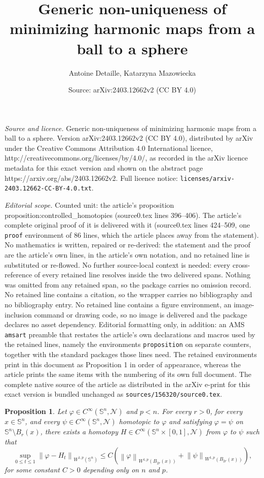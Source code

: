 \documentclass[10pt,a4paper]{amsart}
\title{Generic non-uniqueness of minimizing harmonic maps from a ball to a sphere}
\author{Antoine Detaille, Katarzyna Mazowiecka}
\date{Source: arXiv:2403.12662v2 (CC BY 4.0)}
\newtheorem{proposition}{Proposition}
\def\S{{\mathbb S}}
\newcommand{\brac}[1]{\left (#1 \right )}
\def\n{{\mathcal N}}
\newcommand{\norm}[1]{\left\|{#1}\right\|}
\begin{document}
\maketitle

\noindent\emph{Source and licence.} Generic non-uniqueness of minimizing harmonic maps from a ball to a sphere. Version arXiv:2403.12662v2 (CC BY 4.0), distributed by arXiv under the Creative Commons Attribution 4.0 International licence, http://creativecommons.org/licenses/by/4.0/, as recorded in the arXiv licence metadata for this exact version and shown on the abstract page https://arxiv.org/abs/2403.12662v2. Full licence notice: \texttt{licenses/arxiv-2403.12662-CC-BY-4.0.txt}.\par\smallskip

\noindent\textit{Editorial scope.} Counted unit: the article's proposition proposition:controlled\_homotopies (source0.tex lines 396--406). The article's complete original proof of it is delivered with it (source0.tex lines 424--509, one \texttt{proof} environment of 86 lines, which the article places away from the statement). No mathematics is written, repaired or re-derived: the statement and the proof are the article's own lines, in the article's own notation, and no retained line is substituted or re-flowed.  No further source-local context is needed: every cross-reference of every retained line resolves inside the two delivered spans.  Nothing was omitted from any retained span, so the package carries no omission record.  No retained line contains a citation, so the wrapper carries no bibliography and no bibliography entry.  No retained line contains a figure environment, an image-inclusion command or drawing code, so no image is delivered and the package declares no asset dependency.  Editorial formatting only, in addition: an AMS \texttt{amsart} preamble that restates the article's own declarations and macros used by the retained lines, namely the environments \texttt{proposition} on separate counters, together with the standard packages those lines need.  The retained environments print in this document as Proposition 1 in order of appearance, whereas the article prints the same items with the numbering of its own full document.  The complete native source of the article as distributed in the arXiv e-print for this exact version is bundled unchanged as \texttt{sources/156320/source0.tex}.
\begin{proposition}
\label{proposition:controlled_homotopies}
	Let $ \varphi \in C^{\infty}(\S^n,\n)$ and $p<n$.
	For every $ r > 0 $, for every $ x \in \S^n $, and every $ \psi \in C^{\infty}(\S^n,\n)$ homotopic to $ \varphi $ and satisfying $ \varphi = \psi $ on $ \S^n \setminus B_r(x)  $, there exists a homotopy $ H \in C^{\infty}(\S^n \times [0,1],\n)$ from $ \varphi $ to $ \psi $ such that
	\[
		\sup_{0 \leq t \leq 1} \norm{\varphi - H_{t}}_{W^{1,p}(\S^n)}
		\leq
		C\brac{\norm{\varphi}_{W^{1,p}(B_{2r}(x))} + \norm{\psi}_{W^{1,p}(B_{2r}(x))}}\text{,}
	\]
	for some constant $ C > 0 $ depending only on $ n $ and $ p $.
\end{proposition}
\end{document}
